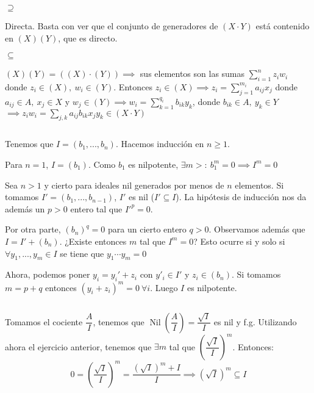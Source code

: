 \documentclass[openany]{book}
\begin{document}
\begin{exercise}
    $  $

    \noindent $ \supseteq $

    Directa. Basta con ver que el conjunto de generadores de $ (X\cdot Y) $ está contenido en $ (X)(Y) $, que es directo.

    \noindent $ \subseteq  $

    $ (X)(Y) = ((X)\cdot (Y)) \implies $ sus elementos son las sumas $ \sum\limits_{i=1}^{n}z_iw_i   $ donde $ z_i \in (X),\ w_i \in (Y) $. Entonces $ z_i \in (X) \implies z_i = \sum\limits_{j=1}^{m_i}a_{ij}x_j $ donde $ a_{ij} \in A,\ x_j \in X $ y $ w_{j} \in (Y) \implies w_i = \sum\limits_{k=1}^{q_{i}}b_{ik} y_{k} $, donde $ b_{ik} \in A,\ y_{k}\in Y $ $ \implies z_iw_i = \sum\limits_{j,k}^{} a_{ij}b_{ik}x_jy_{k} \in (X\cdot Y) $

\end{exercise}

\begin{exercise}$  $

    Tenemos que $ I = (b_1,...,b_n) $. Hacemos inducción en $ n \geq 1 $.  

    Para $ n = 1 $, $ I = (b_1) $. Como $ b_1 $ es nilpotente, $ \exists m > :\ b_1^{m} = 0 \implies I^{m} =0 $

    Sea $ n > 1 $ y cierto para ideales nil generados por menos de $ n $ elementos. Si tomamos $ I' = (b_1,...,b_{n-1}) $, $ I' $ es nil ($ I' \subseteq I $). La hipótesis de inducción nos da además un $ p > 0 $ entero tal que $ I'^{p} =0$.

    Por otra parte, $  (b_n)^{q} = 0 $ para un cierto entero $ q > 0 $. Observamos además que $  I = I'+(b_n) $. ¿Existe entonces $ m $ tal que $ I^{m} = 0 $? Esto ocurre si y solo si $ \forall y_1,...,y_m \in I $ se tiene que $ y_1\cdots y_m  = 0$

    Ahora, podemos poner $ y_i = y_i' + z_i $ con $ y'_{i} \in I' $ y $ z_i \in (b_n) $. Si tomamos $ m = p+q $ entonces $ (y_i+z_i)^{m} = 0\ \forall i $. Luego $ I $ es nilpotente.
\end{exercise}

\begin{exercise}$  $

    Tomamos el cociente $ \dfrac{A}{I} $, tenemos que $ \operatorname{Nil}\left( \dfrac{A}{I} \right) = \dfrac{\sqrt{I}}{I} $ es nil y f.g. Utilizando ahora el ejercicio anterior, tenemos que $ \exists m $ tal que $ \left( \dfrac{\sqrt{I}}{I} \right)^{m} $. Entonces:
    $$ 0 = \left( \dfrac{\sqrt{I}}{I} \right)^{m} = \dfrac{(\sqrt{I})^{m}+I}{I} \implies (\sqrt{I})^{m} \subseteq  I  $$
\end{exercise}
\end{document}
